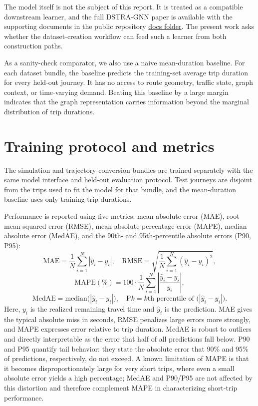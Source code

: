 The model itself is not the subject of this report. It is treated as a compatible downstream learner, and the full DSTRA-GNN paper is available with the supporting documents in the public repository \href{https://github.com/Turgibot/Multi-Variant-Simulated-Traffic-Dataset-Creator-and-Model-Tester/tree/master/docs}{docs folder}. The present work asks whether the dataset-creation workflow can feed such a learner from both construction paths.

As a sanity-check comparator, we also use a naive mean-duration baseline. For each dataset bundle, the baseline predicts the training-set average trip duration for every held-out journey. It has no access to route geometry, traffic state, graph context, or time-varying demand. Beating this baseline by a large margin indicates that the graph representation carries information beyond the marginal distribution of trip durations.

\section{Training protocol and metrics}
The simulation and trajectory-conversion bundles are trained separately with the same model interface and held-out evaluation protocol. Test journeys are disjoint from the trips used to fit the model for that bundle, and the mean-duration baseline uses only training-trip durations.

Performance is reported using five metrics: mean absolute error (MAE), root mean squared error (RMSE), mean absolute percentage error (MAPE), median absolute error (MedAE), and the 90th- and 95th-percentile absolute errors (P90, P95):
\[
\mathrm{MAE}=\frac{1}{N}\sum_{i=1}^{N}|\hat{y}_i-y_i|,
\quad
\mathrm{RMSE}=\sqrt{\frac{1}{N}\sum_{i=1}^{N}(\hat{y}_i-y_i)^2},
\]
\[
\mathrm{MAPE}(\%)=100\cdot\frac{1}{N}\sum_{i=1}^{N}\left|\frac{\hat{y}_i-y_i}{y_i}\right|,
\]
\[
\mathrm{MedAE}=\mathrm{median}\bigl(|\hat{y}_i-y_i|\bigr),
\quad
\mathrm{P}k = k\text{th percentile of }\bigl(|\hat{y}_i-y_i|\bigr).
\]
Here, $y_i$ is the realized remaining travel time and $\hat{y}_i$ is the prediction. MAE gives the typical absolute miss in seconds, RMSE penalizes large errors more strongly, and MAPE expresses error relative to trip duration. MedAE is robust to outliers and directly interpretable as the error that half of all predictions fall below. P90 and P95 quantify tail behavior: they state the absolute error that 90\% and 95\% of predictions, respectively, do not exceed. A known limitation of MAPE is that it becomes disproportionately large for very short trips, where even a small absolute error yields a high percentage; MedAE and P90/P95 are not affected by this distortion and therefore complement MAPE in characterizing short-trip performance.

